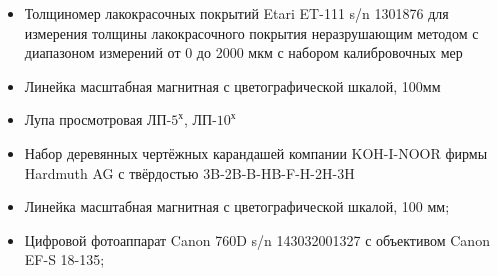 \begin{itemize}
	\item Толщиномер лакокрасочных покрытий Etari ET-111 s/n 1301876 для измерения толщины лакокрасочного покрытия неразрушающим методом с диапазоном измерений от 0 до 2000 мкм с набором калибровочных мер
	\item   Линейка масштабная магнитная с цветографической шкалой, 100мм
	\item  Лупа просмотровая ЛП-$ 5^х $, ЛП-$ 10^х $ 
	\item Набор деревянных чертёжных карандашей компании KOH-I-NOOR фирмы Hardmuth AG с твёрдостью 3B-2B-B-HB-F-H-2H-3H
	\item  Линейка масштабная магнитная с цветографической шкалой, 100 мм;
	\item  Цифровой фотоаппарат  Canon 760D s/n 143032001327  с объективом Canon EF-S 18-135;


\end{itemize}
